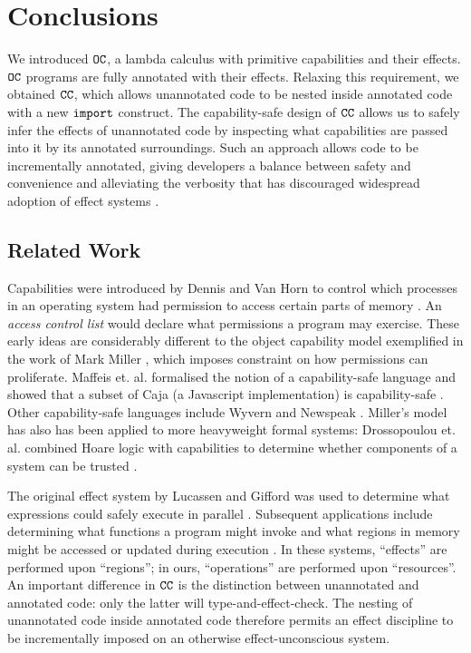 
\section{Conclusions}

We introduced $\mathtt{OC}$, a lambda calculus with primitive capabilities and their effects. $\mathtt{OC}$ programs are fully annotated with their effects. Relaxing this requirement, we obtained $\mathtt{CC}$, which allows unannotated code to be nested inside annotated code with a new $\mathtt{import}$ construct. The capability-safe design of $\mathtt{CC}$ allows us to safely infer the effects of unannotated code by inspecting what capabilities are passed into it by its annotated surroundings. Such an approach allows code to be incrementally annotated, giving developers a balance between safety and convenience and alleviating the verbosity that has discouraged widespread adoption of effect systems \cite{rytz12}.

\subsection{Related Work}

Capabilities were introduced by Dennis and Van Horn to control which processes in an operating system had permission to access certain parts of memory \cite{dennis66}. An \textit{access control list} would declare what permissions a program may exercise. These early ideas are considerably different to the object capability model exemplified in the work of Mark Miller \cite{miller06}, which imposes constraint on how permissions can proliferate. Maffeis et. al. formalised the notion of a capability-safe language and showed that a subset of Caja (a Javascript implementation) is capability-safe \cite{maffeis10}. Other capability-safe languages include Wyvern \cite{nistor13} and Newspeak \cite{bracha10}. Miller's model has also has been applied to more heavyweight formal systems: Drossopoulou et. al. combined Hoare logic with capabilities to determine whether components of a system can be trusted \cite{drossopoulou07}.

The original effect system by Lucassen and Gifford was used to determine what expressions could safely execute in parallel \cite{lucassen88}. Subsequent applications include determining what functions a program might invoke \cite{tang94} and what regions in memory might be accessed or updated during execution \cite{talpin94}. In these systems, ``effects'' are performed upon ``regions''; in ours, ``operations'' are performed upon ``resources''. An important difference in $\mathtt{CC}$ is the distinction between unannotated and annotated code: only the latter will type-and-effect-check. The nesting of unannotated code inside annotated code therefore permits an effect discipline to be incrementally imposed on an otherwise effect-unconscious system.

